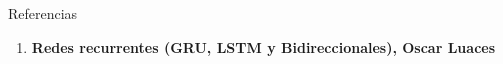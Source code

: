 \documentclass[aspectratio=169]{beamer}
\begin{document}
\begin{frame}[t]{Referencias}
	\begin{enumerate}
	  \item \textbf{Redes recurrentes (GRU, LSTM y Bidireccionales), Oscar Luaces}
	\end{enumerate}
  \end{frame}
\end{document}

